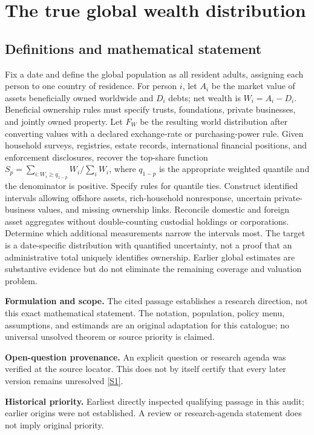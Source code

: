 \documentclass[11pt]{article}
\newcommand{\sref}[2]{\hyperlink{source:#1:#2}{[S#2]}}
\begin{document}
\section*{The true global wealth distribution}\label{30007643}
\subsection{Definitions and mathematical statement}
Fix a date and define the global population as all resident adults, assigning each person to one country of residence. For person \(i\), let \(A_i\) be the market value of assets beneficially owned worldwide and \(D_i\) debts; net wealth is \(W_i=A_i-D_i\). Beneficial ownership rules must specify trusts, foundations, private businesses, and jointly owned property. Let \(F_W\) be the resulting world distribution after converting values with a declared exchange-rate or purchasing-power rule. Given household surveys, registries, estate records, international financial positions, and enforcement disclosures, recover the top-share function \(S_p=\sum_{i:W_i\ge q_{1-p}}W_i/\sum_iW_i\), where \(q_{1-p}\) is the appropriate weighted quantile and the denominator is positive. Specify rules for quantile ties. Construct identified intervals allowing offshore assets, rich-household nonresponse, uncertain private-business values, and missing ownership links. Reconcile domestic and foreign asset aggregates without double-counting custodial holdings or corporations. Determine which additional measurements narrow the intervals most. The target is a date-specific distribution with quantified uncertainty, not a proof that an administrative total uniquely identifies ownership. Earlier global estimates are substantive evidence but do not eliminate the remaining coverage and valuation problem.

\par\textbf{Formulation and scope.} The cited passage establishes a research direction, not this exact mathematical statement. The notation, population, policy menu, assumptions, and estimands are an original adaptation for this catalogue; no universal unsolved theorem or source priority is claimed.

\par\textbf{Open-question provenance.} An explicit question or research agenda was verified at the source locator. This does not by itself certify that every later version remains unresolved \sref{30007643}{1}.

\par\textbf{Historical priority.} Earliest directly inspected qualifying passage in this audit; earlier origins were not established. A review or research-agenda statement does not imply original priority.
\end{document}
